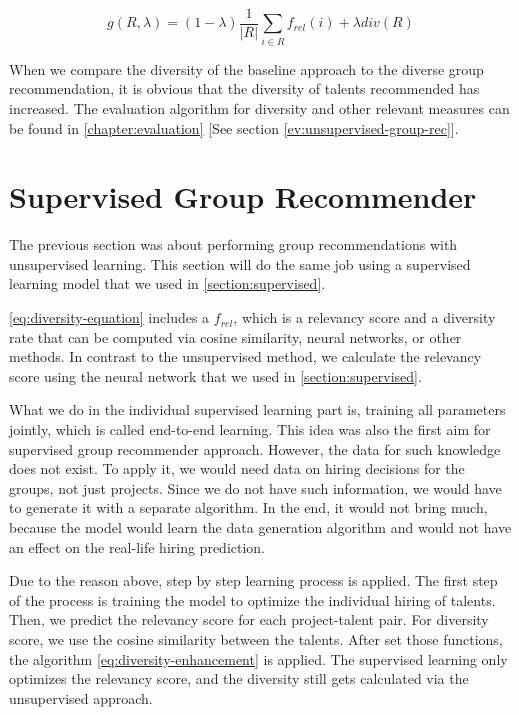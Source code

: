 \begin{equation}
g ( R , \lambda ) = ( 1 - \lambda ) \frac { 1 } { | R | } \sum _ { i \in R } f _ { r e l } ( i ) + \lambda d i v ( R )
\label{eq:diversity-equation}
\end{equation}

When we compare the diversity of the baseline approach to the diverse group recommendation, it is obvious that the diversity of talents recommended has increased. The evaluation algorithm for diversity and other relevant measures can be found in \autoref{chapter:evaluation} [See section \ref{ev:unsupervised-group-rec}].

\section{Supervised Group Recommender}\label{section:supervised-group-rec}

The previous section was about performing group recommendations with unsupervised learning. This section will do the same job using a supervised learning model that we used in \autoref{section:supervised}.


\autoref{eq:diversity-equation} includes a $f _ { rel } $, which is a relevancy score and a diversity rate that can be computed via cosine similarity, neural networks, or other methods. In contrast to the unsupervised method, we calculate the relevancy score using the neural network that we used in \autoref{section:supervised}.

What we do in the individual supervised learning part is, training all parameters jointly, which is called end-to-end learning. This idea was also the first aim for supervised group recommender approach. However, the data for such knowledge does not exist. To apply it, we would need data on hiring decisions for the groups, not just projects. Since we do not have such information, we would have to generate it with a separate algorithm. In the end, it would not bring much, because the model would learn the data generation algorithm and would not have an effect on the real-life hiring prediction.


Due to the reason above, step by step learning process is applied. The first step of the process is training the model to optimize the individual hiring of talents. Then, we predict the relevancy score for each project-talent pair. For diversity score, we use the cosine similarity between the talents. After set those functions, the algorithm \ref{eq:diversity-enhancement} is applied. The supervised learning only optimizes the relevancy score, and the diversity still gets calculated via the unsupervised approach.


